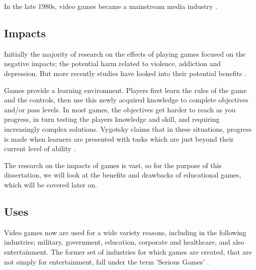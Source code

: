 \documentclass[a4paper,11.5pt]{report}
\numberwithin{figure}{section}
\numberwithin{table}{section}
\numberwithin{equation}{section}
\numberwithin{equation}{section}
\begin{document}
In the late 1980s, video games became a mainstream media industry \citep{Dmitri2003}.

\subsection{Impacts}

Initially the majority of research on the effects of playing games focused on the negative impacts; the potential harm related to violence, addiction and depression. But more recently studies have looked into their potential benefits \citep{Granic2014, Boyle2011, Ryan2006}.

Games provide a learning environment. Players first learn the rules of the game and the controls, then use this newly acquired knowledge to complete objectives and/or pass levels. In most games, the objectives get harder to reach as you progress, in turn testing the players knowledge and skill, and requiring increasingly complex solutions. Vygotsky claims that in these situations, progress is made when learners are presented with tasks which are just beyond their current level of ability \cite{}.

The research on the impacts of games is vast, so for the purpose of this dissertation, we will look at the benefits and drawbacks of educational games, which will be covered later on.

\subsection{Uses}

Video games now are used for a wide variety reasons, including in the following industries; military, government, education, corporate and healthcare, and also entertainment. The former set of industries for which games are created, that are not simply for entertainment, fall under the term 'Serious Games' \citep{Johann2015}.


\end{document}
